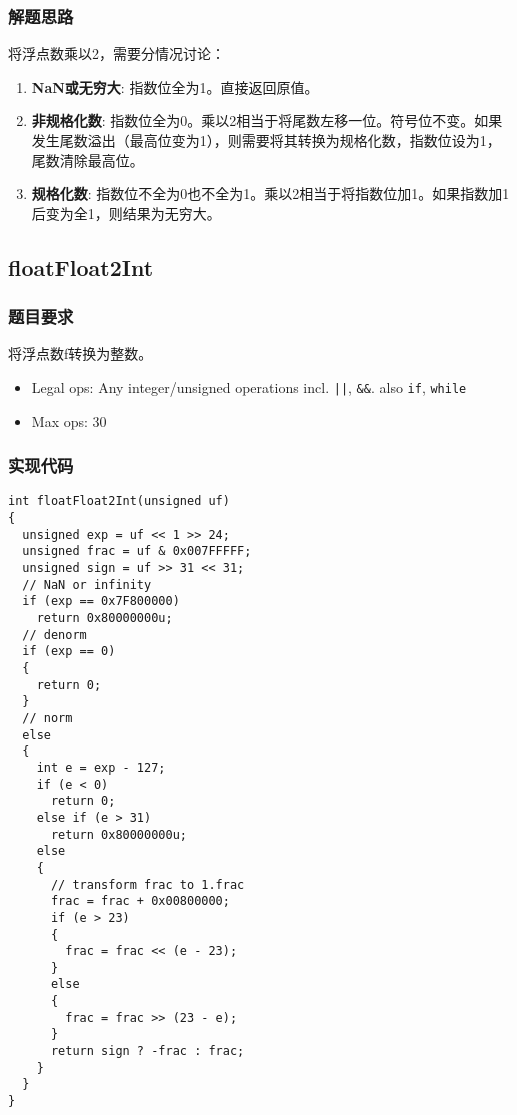 \documentclass{article}
\begin{document}
\subsubsection{解题思路}
将浮点数乘以2，需要分情况讨论：
\begin{enumerate}
    \item \textbf{NaN或无穷大}: 指数位全为1。直接返回原值。
    \item \textbf{非规格化数}: 指数位全为0。乘以2相当于将尾数左移一位。符号位不变。如果发生尾数溢出（最高位变为1），则需要将其转换为规格化数，指数位设为1，尾数清除最高位。
    \item \textbf{规格化数}: 指数位不全为0也不全为1。乘以2相当于将指数位加1。如果指数加1后变为全1，则结果为无穷大。
\end{enumerate}

\subsection{floatFloat2Int}
\subsubsection{题目要求}
将浮点数f转换为整数。
\begin{itemize}
    \item Legal ops: Any integer/unsigned operations incl. \texttt{||}, \texttt{\&\&}. also \texttt{if}, \texttt{while}
    \item Max ops: 30
\end{itemize}

\subsubsection{实现代码}
\begin{lstlisting}[caption={floatFloat2Int}]
int floatFloat2Int(unsigned uf)
{
  unsigned exp = uf << 1 >> 24;
  unsigned frac = uf & 0x007FFFFF;
  unsigned sign = uf >> 31 << 31;
  // NaN or infinity
  if (exp == 0x7F800000)
    return 0x80000000u;
  // denorm
  if (exp == 0)
  {
    return 0;
  }
  // norm
  else
  {
    int e = exp - 127;
    if (e < 0)
      return 0;
    else if (e > 31)
      return 0x80000000u;
    else
    {
      // transform frac to 1.frac
      frac = frac + 0x00800000;
      if (e > 23)
      {
        frac = frac << (e - 23);
      }
      else
      {
        frac = frac >> (23 - e);
      }
      return sign ? -frac : frac;
    }
  }
}
\end{lstlisting}
\end{document}
